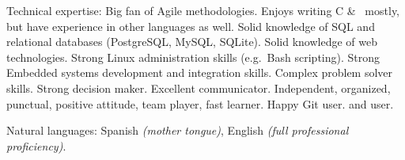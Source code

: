 \documentclass[10pt,a4paper]{article}
\begin{document}
\spacedhrule{0.5em}{-0.4em}


\inlineheadsection  %
{Technical expertise:}
{Big fan of Agile methodologies. Enjoys writing C \& \nsp\CPP\nsp\, mostly, but have experience in other languages as well. Solid knowledge of SQL and relational databases (PostgreSQL, MySQL, SQLite). Solid knowledge of web technologies. Strong Linux administration skills (e.g.\ Bash scripting). Strong Embedded systems development and integration skills. Complex problem solver skills. Strong decision maker. Excellent communicator. Independent, organized, punctual, positive attitude, team player, fast learner. Happy Git user.  and  user.}

\vspace{0.5em}
\inlineheadsection
{Natural languages:}
{Spanish \emph{(mother tongue)}, English \emph{(full professional proficiency)}.}

\spacedhrule{1.6em}{-0.4em}
\end{document}
